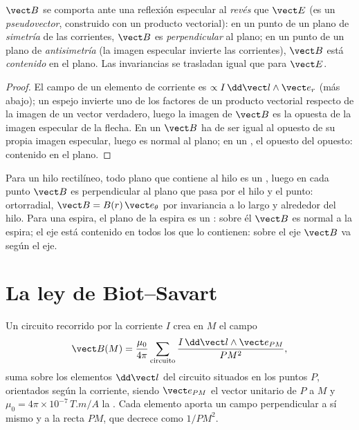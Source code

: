 \begin{proposition}\label{prop:b1:magnetostatics:symmetry}
$\vect B$ se comporta ante una reflexión especular al \emph{revés} que
$\vect E$ (es un \emph{pseudovector}, construido con un producto
vectorial): en un punto de un plano de \emph{simetría} de las corrientes,
$\vect B$ es \emph{perpendicular} al plano; en un punto de un plano de
\emph{antisimetría} (la imagen especular invierte las corrientes),
$\vect B$ está \emph{contenido} en el plano. Las invariancias se
trasladan igual que para $\vect E$.
\end{proposition}

\begin{proof}
El campo de un elemento de corriente es $\propto I\,\dd\vect l\wedge\vect e_r$
(más abajo); un espejo invierte uno de los factores de un producto
vectorial respecto de la imagen de un vector verdadero, luego la imagen
de $\vect B$ es la opuesta de la imagen especular de la flecha. En un
 $\vect B$ ha de ser igual al opuesto de su propia
imagen especular, luego es normal al plano; en un ,
el opuesto del opuesto: contenido en el plano.
\end{proof}

\begin{example}\label{ex:b1:magnetostatics:symmetryuse}
Para un hilo rectilíneo, todo plano que contiene al hilo es un , luego en cada punto $\vect B$ es perpendicular al plano que
pasa por el hilo y el punto: ortorradial, $\vect B = B(r)\,\vect e_\theta$
por invariancia a lo largo y alrededor del hilo. Para una espira, el
plano de la espira es un : sobre él $\vect B$ es normal
a la espira; el eje está contenido en todos los 
que lo contienen: sobre el eje $\vect B$ va según el eje.
\end{example}

\section{La ley de Biot--Savart}

\begin{theorem}\label{thm:b1:magnetostatics:biotsavart}
Un circuito recorrido por la corriente $I$ crea en $M$ el campo
\[
\vect B(M) = \frac{\mu_0}{4\pi}\sum_{\text{circuito}} \frac{I\,\dd\vect l\wedge\vect e_{PM}}{PM^2} ,
\]
suma sobre los elementos $\dd\vect l$ del circuito situados en los puntos
$P$, orientados según la corriente, siendo $\vect e_{PM}$ el vector
unitario de $P$ a $M$ y $\mu_0 = 4\pi \times 10^{-7}\,\unit{T.m/A}$ la
\emph{}. Cada elemento aporta un campo
perpendicular a sí mismo y a la recta $PM$, que decrece como $1/PM^2$.
\end{theorem}
\admitted

